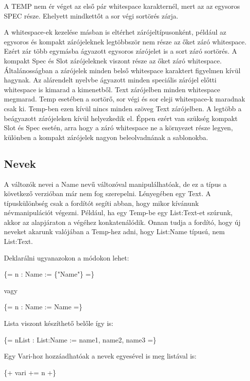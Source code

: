{A TEMP nem ér véget az első pár whitespace karakternél, mert az az egysoros SPEC része.
Ehelyett mindkettőt a sor végi sortörés zárja.

A whitespace-ek kezelése másban is eltérhet zárójeltípusonként, például az egysoros és kompakt zárójeleknek legtöbbször nem része az őket záró whitespace. 
Ezért zár több egymásba ágyazott egysoros zárójelet is a sort záró sortörés. 
A kompakt Spec és Slot zárójeleknek viszont része az őket záró whitespace. 
Általánosságban a zárójelek minden belső whitespace karaktert figyelmen kívül hagynak. 
Az alárendelt nyelvbe ágyazott minden speciális zárójel előtti whitespace is kimarad a kimenetből. 
Text zárójelben minden whitespace megmarad. 
Temp esetében a sortörő, sor végi és sor eleji whitespace-k maradnak csak ki. 
Temp-ben ezen kívül nincs minden szöveg Text zárójelben. 
A legtöbb a beágyazott zárójeleken kívül helyezkedik el. 
Éppen ezért van szükség kompakt Slot és Spec esetén, arra hogy a záró whitespace ne a környezet része legyen, különben a kompakt zárójelek nagyon beleolvadnának a sablonokba.



\subsection{Nevek}
\label{sec:SName}
A változók nevei a Name nevű változóval manipulálhatóak, de ez a típus a következő verzióban már nem fog szerepelni.
Lényegében egy Text.
A típuskülönbség csak a fordítót segíti abban, hogy mikor kívánunk névmanipulációt végezni.
Például, ha egy Temp-be egy List:Text-et szúrunk, akkor az alapjáraton a végéhez konkatenálódik.
Onnan tudja a fordító, hogy új neveket akarunk valójában a Temp-hez adni, hogy List:Name típusú, nem List:Text.

Deklarálni ugyanazokon a módokon lehet:

\{= n : Name := \{"Name"\} =\}

vagy

\{= n : Name := Name =\}

Lista viszont készíthető belőle így is:

\{= nList : List:Name := name1, name2, name3 =\}

Egy Vari-hoz hozzáadhatóak a nevek egyesével is meg listával is:

\{+ vari += n +\}

}
